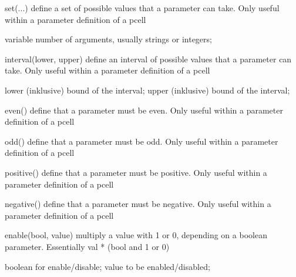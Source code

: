 \begin{APIfunc}{set(...)}
    define a set of possible values that a parameter can take. Only useful within a parameter definition of a pcell
    \begin{APIparameters}
            variable number of arguments, usually strings or integers;
    \end{APIparameters}
\end{APIfunc}
\begin{APIfunc}{interval(lower, upper)}
    define an interval of possible values that a parameter can take. Only useful within a parameter definition of a pcell
    \begin{APIparameters}
            lower (inklusive) bound of the interval;
            upper (inklusive) bound of the interval;
    \end{APIparameters}
\end{APIfunc}
\begin{APIfunc}{even()}
    define that a parameter must be even. Only useful within a parameter definition of a pcell
    \begin{APIparameters}
    \end{APIparameters}
\end{APIfunc}
\begin{APIfunc}{odd()}
    define that a parameter must be odd. Only useful within a parameter definition of a pcell
    \begin{APIparameters}
    \end{APIparameters}
\end{APIfunc}
\begin{APIfunc}{positive()}
    define that a parameter must be positive. Only useful within a parameter definition of a pcell
    \begin{APIparameters}
    \end{APIparameters}
\end{APIfunc}
\begin{APIfunc}{negative()}
    define that a parameter must be negative. Only useful within a parameter definition of a pcell
    \begin{APIparameters}
    \end{APIparameters}
\end{APIfunc}
\begin{APIfunc}{enable(bool, value)}
    multiply a value with 1 or 0, depending on a boolean parameter. Essentially val * (bool and 1 or 0)
    \begin{APIparameters}
            boolean for enable/disable;
            value to be enabled/disabled;
    \end{APIparameters}
\end{APIfunc}
